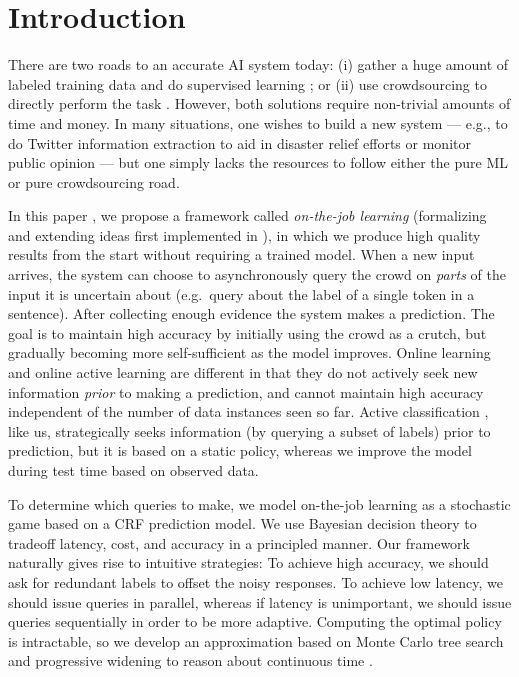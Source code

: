 \section{Introduction}
\label{sec:intro}

There are two roads to an accurate AI system today:
(i) gather a huge amount of labeled training data \citep{deng2009imagenet} and do supervised learning \citep{krizhevsky2012imagenet};
or (ii) use crowdsourcing to directly perform the task \citep{bernstein2010soylent,kokkalis2013emailvalet}.
However, both solutions require non-trivial amounts of time and money.
In many situations, one wishes to build a new system --- e.g., to do Twitter information extraction
\citep{li2012twiner} to aid in disaster relief efforts or monitor public
opinion --- but one simply lacks the resources to follow either the pure ML or pure crowdsourcing road.

In this paper , we propose a framework called \emph{on-the-job learning} (formalizing and extending ideas first implemented in \citep{lasecki2013realtime}),
in which we produce high quality results from the start without requiring a trained model.
When a new input arrives,
the system can choose to asynchronously query the crowd on \emph{parts} of the input it is
uncertain about (e.g.\ query about the label of a single token in a sentence). After collecting enough evidence the system makes a prediction.
The goal is to maintain high accuracy by initially using the crowd as a crutch,
but gradually becoming more self-sufficient as the model improves.
Online learning \citep{cesabianchi06prediction} and
online active learning \citep{helmbold1997some,sculley2007online,chu2011unbiased}
are different in that
they do not actively seek new information \emph{prior} to making a prediction,
and cannot maintain high accuracy independent of the number of data instances seen so far.
Active classification \citep{gao2011active}, like us,
strategically seeks information (by querying a subset of labels) prior to prediction,
but it is based on a static policy, 
whereas we improve the model during test time based on observed data.

To determine which queries to make,
we model on-the-job learning as a stochastic game based on a CRF prediction model.
We use Bayesian decision theory to tradeoff latency, cost, and accuracy in a principled manner.
Our framework naturally gives rise to intuitive strategies:
To achieve high accuracy, we should ask for redundant labels
to offset the noisy responses.  To achieve low latency, we should issue queries
in parallel, whereas if latency is unimportant, we should issue queries
sequentially in order to be more adaptive.
Computing the optimal policy is intractable,
so we develop an approximation
based on Monte Carlo tree search \citep{kocsis2006bandit} and
progressive widening to reason about continuous time \citep{coulom2007computing}.

